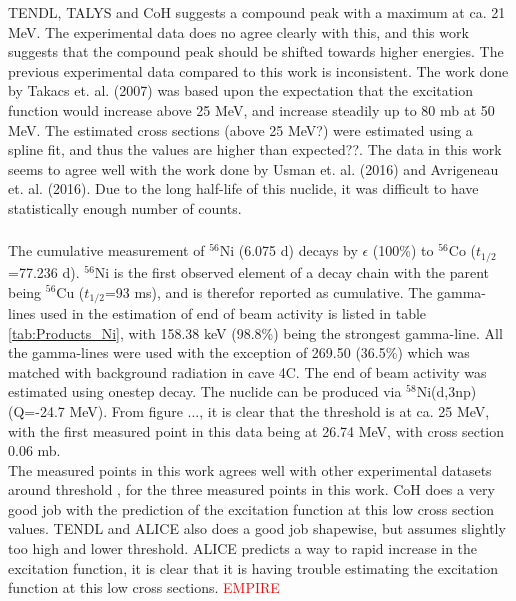 TENDL, TALYS and CoH suggests a compound peak with a maximum at ca. 21 MeV. The experimental data does no agree clearly with this, and this work suggests that the compound peak should be shifted towards higher energies. The previous experimental data \cite{Avrigeanu2016, Usman2016, Hermanne2013, Takacs2007} compared to this work is inconsistent. The work done by Takacs et. al. (2007) was based upon the expectation that the excitation function would increase above 25 MeV, and increase steadily up to 80 mb at 50 MeV. The  estimated cross sections (above 25 MeV?) were estimated using a spline fit, and thus the values are higher than expected??. The data in this work seems to agree well with the work done by Usman et. al. (2016) and Avrigeneau et. al. (2016). Due to the long half-life of this nuclide, it was difficult to have statistically enough number of counts.   

\subsubsection{}
The cumulative measurement of $^{56}$Ni (6.075 d) decays by $\epsilon$ (100\%) to $^{56}$Co ($t_{1/2}$=77.236 d). $^{56}$Ni is the first observed element of a decay chain with the parent being $^{56}$Cu ($t_{1/2}$=93 ms)\cite{Junde2011}, and is therefor reported as cumulative. The gamma-lines used in the estimation of end of beam activity is listed in table \ref{tab:Products_Ni}, with 158.38 keV (98.8\%) being the strongest gamma-line. All the gamma-lines were used with the exception of 269.50 (36.5\%) which was matched with background radiation in cave 4C. The end of beam activity was estimated using onestep decay. The nuclide can be produced via $^{58}$Ni(d,3np) (Q=-24.7 MeV). From figure ..., it is clear that the threshold is at ca. 25 MeV, with the first measured point in this data being at 26.74 MeV, with cross section 0.06 mb.  \\

\noindent 
The measured points in this work agrees well with other experimental datasets around threshold \cite{Hermanne2013, Amjed2013, Takacs2007}, for the three measured points in this work. CoH does a very good job with the prediction of the excitation function at this low cross section values. TENDL and ALICE also does a good job shapewise, but assumes slightly too high and lower threshold. ALICE predicts a  way to rapid increase in the excitation function, it is clear that it is having trouble estimating the excitation function at this low cross sections. \textcolor{red}{EMPIRE}

